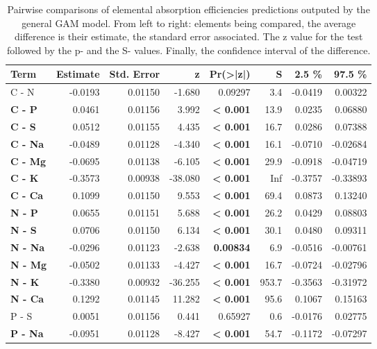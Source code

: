 \begin{table}[H]
\centering
\caption{\label{tab:table_pairs_i_ae}Pairwise comparisons of elemental absorption efficiencies predictions outputed by the general GAM model. From left to right: elements being compared, the average difference is their estimate, the standard error associated. The z value for the test followed by the p- and the S- values. Finally, the confidence interval of the difference.}
\centering
\begin{tabular}[t]{>{}lrrr>{}rrrr}
\toprule
\textbf{Term} & \textbf{Estimate} & \textbf{Std. Error} & \textbf{z} & \textbf{Pr(>|z|)} & \textbf{S} & \textbf{2.5 \%} & \textbf{97.5 \%}\\
\midrule
C - N & -0.0193 & 0.01150 & -1.680 & 0.09297 & 3.4 & -0.0419 & 0.00322\\
\textbf{C - P} & 0.0461 & 0.01156 & 3.992 & \textbf{< 0.001} & 13.9 & 0.0235 & 0.06880\\
\textbf{C - S} & 0.0512 & 0.01155 & 4.435 & \textbf{< 0.001} & 16.7 & 0.0286 & 0.07388\\
\textbf{C - Na} & -0.0489 & 0.01128 & -4.340 & \textbf{< 0.001} & 16.1 & -0.0710 & -0.02684\\
\textbf{C - Mg} & -0.0695 & 0.01138 & -6.105 & \textbf{< 0.001} & 29.9 & -0.0918 & -0.04719\\
\textbf{C - K} & -0.3573 & 0.00938 & -38.080 & \textbf{< 0.001} & Inf & -0.3757 & -0.33893\\
\textbf{C - Ca} & 0.1099 & 0.01150 & 9.553 & \textbf{< 0.001} & 69.4 & 0.0873 & 0.13240\\
\textbf{N - P} & 0.0655 & 0.01151 & 5.688 & \textbf{< 0.001} & 26.2 & 0.0429 & 0.08803\\
\textbf{N - S} & 0.0706 & 0.01150 & 6.134 & \textbf{< 0.001} & 30.1 & 0.0480 & 0.09311\\
\textbf{N - Na} & -0.0296 & 0.01123 & -2.638 & \textbf{0.00834} & 6.9 & -0.0516 & -0.00761\\
\textbf{N - Mg} & -0.0502 & 0.01133 & -4.427 & \textbf{< 0.001} & 16.7 & -0.0724 & -0.02796\\
\textbf{N - K} & -0.3380 & 0.00932 & -36.255 & \textbf{< 0.001} & 953.7 & -0.3563 & -0.31972\\
\textbf{N - Ca} & 0.1292 & 0.01145 & 11.282 & \textbf{< 0.001} & 95.6 & 0.1067 & 0.15163\\
P - S & 0.0051 & 0.01156 & 0.441 & 0.65927 & 0.6 & -0.0176 & 0.02775\\
\textbf{P - Na} & -0.0951 & 0.01128 & -8.427 & \textbf{< 0.001} & 54.7 & -0.1172 & -0.07297\\

\end{tabular}
\end{table}
